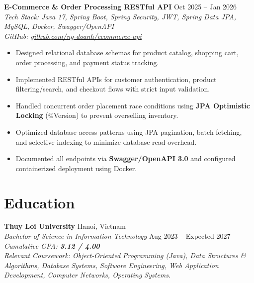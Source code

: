 ﻿\documentclass[10pt,a4paper]{article}
\begin{document}
\textbf{E-Commerce \& Order Processing RESTful API} \hfill Oct 2025 -- Jan 2026 \\
\textit{Tech Stack: Java 17, Spring Boot, Spring Security, JWT, Spring Data JPA, MySQL, Docker, Swagger/OpenAPI} \\
\textit{GitHub: \href{https://github.com/ng-doanh/ecommerce-api}{github.com/ng-doanh/ecommerce-api}}
\begin{itemize}[leftmargin=1.2em, itemsep=1.8pt, topsep=2pt]
    \item Designed relational database schemas for product catalog, shopping cart, order processing, and payment status tracking.
    \item Implemented RESTful APIs for customer authentication, product filtering/search, and checkout flows with strict input validation.
    \item Handled concurrent order placement race conditions using \textbf{JPA Optimistic Locking} (@Version) to prevent overselling inventory.
    \item Optimized database access patterns using JPA pagination, batch fetching, and selective indexing to minimize database read overhead.
    \item Documented all endpoints via \textbf{Swagger/OpenAPI 3.0} and configured containerized deployment using Docker.
\end{itemize}

\section{Education}
\textbf{Thuy Loi University} \hfill Hanoi, Vietnam \\
\textit{Bachelor of Science in Information Technology} \hfill Aug 2023 -- Expected 2027 \\
\textit{Cumulative GPA: \textbf{3.12 / 4.00}} \\
{\small \textit{Relevant Coursework: Object-Oriented Programming (Java), Data Structures \& Algorithms, Database Systems, Software Engineering, Web Application Development, Computer Networks, Operating Systems.}}
\end{document}
